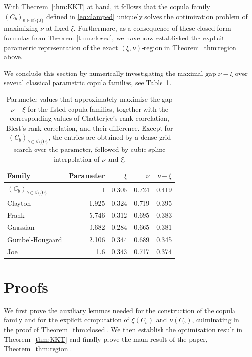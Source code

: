 \documentclass{article}
\newcommand{\1}{\mathds{1}}
\newcommand{\R}{\mathbb{R}}
\begin{document}
With Theorem~\ref{thm:KKT} at hand, it follows that the copula family $(C_b)_{b\in\R\setminus\{0\}}$ defined in \eqref{eq:clamped} uniquely solves the optimization problem of maximizing $\nu$ at fixed $\xi$.
Furthermore, as a consequence of these closed-form formulas from Theorem \ref{thm:closed}, we have now established the explicit parametric representation of the exact \((\xi,\nu)\)-region in Theorem~\ref{thm:region} above.

We conclude this section by numerically investigating the maximal gap \(\nu-\xi\) over several classical parametric copula families, see Table~\ref{tab:nu_minus_xi_max}.

\begin{table}[htbp]
  \centering
  \begin{tabular}{lrrrr}
    \toprule
    Family & Parameter & $\xi$ & $\nu$ & $\nu-\xi$ \\
    \midrule
    \((C_b)_{b\in\R\setminus\{0\}}\)        &      1 &        0.305 &   0.724 &     0.419 \\
    Clayton     &      1.925 &    0.324 &   0.719 &     0.395 \\
    Frank          &      5.746 &    0.312 &   0.695 &     0.383 \\
    Gaussian       &      0.682 &    0.284 &   0.665 &     0.381 \\
    Gumbel-Hougaard &      2.106 &    0.344 &   0.689 &     0.345 \\
    Joe            &      1.6 &      0.343 &   0.717 &     0.374 \\
    \bottomrule
  \end{tabular}
  \caption{
  Parameter values that approximately maximize the gap $\nu-\xi$ for the listed copula families, together with the 
  corresponding values of Chatterjee's rank correlation, Blest's rank correlation, and their difference.
  Except for \((C_b)_{b\in\R\setminus\{0\}}\), the entries are obtained by a dense grid search over the parameter, followed by cubic-spline interpolation of \(\nu\) and \(\xi\).
  }
  \label{tab:nu_minus_xi_max}
\end{table}

\section{Proofs}
\label{sec:proofs}

We first prove the auxiliary lemmas needed for the construction of the copula family and for the explicit computation of \(\xi(C_b)\) and \(\nu(C_b)\), culminating in the proof of Theorem~\ref{thm:closed}. We then establish the optimization result in Theorem~\ref{thm:KKT} and finally prove the main result of the paper, Theorem~\ref{thm:region}.
\end{document}
